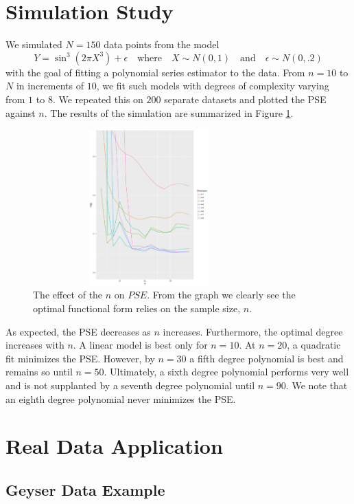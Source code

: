 \documentclass[12pt]{article}  %
\begin{document}
\section{Simulation Study}

We simulated $N = 150$ data points from the model
$$Y = \sin^3(2\pi X^3) + \epsilon\hspace{1em}\text{where}\hspace{1em}X \sim N(0,1)\hspace{1em}\text{and}\hspace{1em}
\epsilon \sim N(0, .2)$$
with the goal of fitting a polynomial series estimator to the data. From $n = 10$ to $N$ in increments of $10$, we fit such models with degrees of complexity varying from $1$ to $8$. We repeated this on $200$ separate datasets and plotted the PSE against $n$. The results of the simulation are summarized in Figure \ref{fig:sim}. 
\begin{figure}[h]
    \centering
    \includegraphics[width=0.8\textwidth, height= 6cm]{sim_plot.pdf}  
    \caption{The effect of the $n$ on $PSE$. From the graph we clearly see the optimal functional form relies on the sample size, $n$.}
    \label{fig:sim}{}
\end{figure}
 As expected, the PSE decreases as $n$ increases. Furthermore, the optimal degree increases with $n$. A linear model is best only for $n=10$. At $n=20$, a quadratic fit minimizes the PSE. However, by $n=30$ a fifth degree polynomial is best and remains so until $n=50$. Ultimately, a sixth degree polynomial performs very well and is not supplanted by a seventh degree polynomial until $n=90$. We note that an eighth degree polynomial never minimizes the PSE.


\section{Real Data Application}
\subsection{Geyser Data Example}
\end{document}
